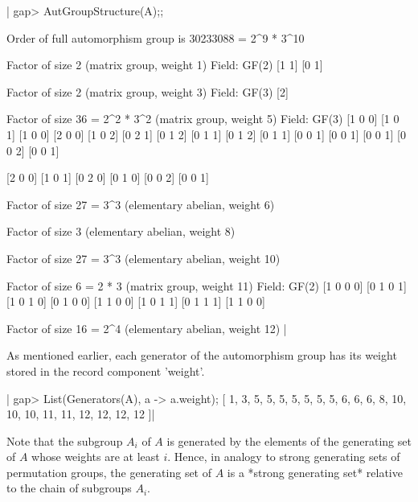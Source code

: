 |    gap> AutGroupStructure(A);;
    
     Order of full automorphism group is 30233088 = 2^9 * 3^10
    
     Factor of size 2 (matrix group, weight 1)
      Field: GF(2)
        [1 1]
        [0 1]
    
     Factor of size 2 (matrix group, weight 3)
      Field: GF(3)
        [2]
    
     Factor of size 36 = 2^2 * 3^2 (matrix group, weight 5)
      Field: GF(3)
        [1 0 0]    [1 0 1]    [1 0 0]    [2 0 0]    [1 0 2]
        [0 2 1]    [0 1 2]    [0 1 1]    [0 1 2]    [0 1 1]
        [0 0 1]    [0 0 1]    [0 0 1]    [0 0 2]    [0 0 1]
    
        [2 0 0]    [1 0 1]
        [0 2 0]    [0 1 0]
        [0 0 2]    [0 0 1]
    
     Factor of size 27 = 3^3 (elementary abelian, weight 6)
    
     Factor of size 3 (elementary abelian, weight 8)
    
     Factor of size 27 = 3^3 (elementary abelian, weight 10)
    
     Factor of size 6 = 2 * 3 (matrix group, weight 11)
      Field: GF(2)
        [1 0 0 0]    [0 1 0 1]
        [1 0 1 0]    [0 1 0 0]
        [1 1 0 0]    [1 0 1 1]
        [0 1 1 1]    [1 1 0 0]
    
     Factor of size 16 = 2^4 (elementary abelian, weight 12)
    |
    
\bigskip

As mentioned earlier, each generator of the automorphism group has its weight
stored in the record component 'weight'.

|    gap> List(Generators(A), a -> a.weight);
    [ 1, 3, 5, 5, 5, 5, 5, 5, 5, 6, 6, 6, 8, 10, 10, 10, 11, 11, 12, 12, 
      12, 12 ]|

\bigskip

Note that the subgroup $A_i$ of $A$ is generated by the elements of the
generating set of $A$ whose weights are at least $i$.  Hence, in analogy to
strong generating sets of permutation groups, the generating set of $A$ is
a *strong generating set* relative to the chain of subgroups $A_i$.

